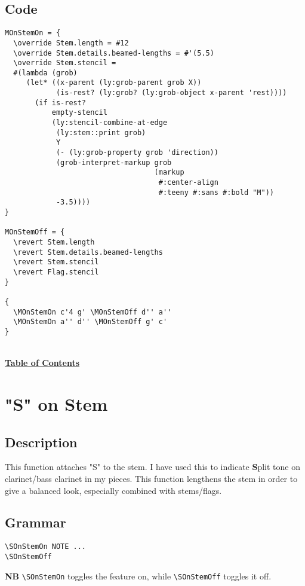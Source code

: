 \documentclass[11pt, oneside]{book}   	%
\begin{document}
\subsection{Code}
\begin{verbatim}
MOnStemOn = {
  \override Stem.length = #12
  \override Stem.details.beamed-lengths = #'(5.5)
  \override Stem.stencil =
  #(lambda (grob)
     (let* ((x-parent (ly:grob-parent grob X))
            (is-rest? (ly:grob? (ly:grob-object x-parent 'rest))))
       (if is-rest?
           empty-stencil
           (ly:stencil-combine-at-edge
            (ly:stem::print grob)
            Y
            (- (ly:grob-property grob 'direction))
            (grob-interpret-markup grob
                                   (markup
                                    #:center-align
                                    #:teeny #:sans #:bold "M"))
            -3.5))))
}

MOnStemOff = {
  \revert Stem.length
  \revert Stem.details.beamed-lengths
  \revert Stem.stencil
  \revert Flag.stencil
}

{
  \MOnStemOn c'4 g' \MOnStemOff d'' a''
  \MOnStemOn a'' d'' \MOnStemOff g' c'
}
\end{verbatim}
\hyperref[sec:toc]{\\ \textbf{Table of Contents}}

\vfill \break



\section {"S" on Stem}
\hfill

\subsection{Description}
This function attaches "S" to the stem. I have used this to indicate \textbf{S}plit tone on clarinet/bass clarinet in my pieces. This function lengthens the stem in order to give a balanced look, especially combined with stems/flags. 
\subsection{Grammar}
\begin{verbatim}
\SOnStemOn NOTE ...
\SOnStemOff
\end{verbatim}
\textbf{NB} \verb|\SOnStemOn| toggles the feature on, while \verb|\SOnStemOff| toggles it off.
\end{document}
